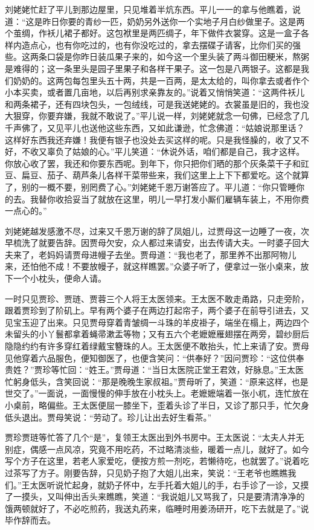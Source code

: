 刘姥姥忙赶了平儿到那边屋里，只见堆着半炕东西。平儿一一的拿与他瞧着，说道：``这是昨日你要的青纱一匹，奶奶另外送你一个实地子月白纱做里子。这是两个茧绸，作袄儿裙子都好。这包袱里是两匹绸子，年下做件衣裳穿。这是一盒子各样内造点心，也有你吃过的，也有你没吃过的，拿去摆碟子请客，比你们买的强些。这两条口袋是你昨日装瓜果子来的，如今这一个里头装了两斗御田粳米，熬粥是难得的；这一条里头是园子里果子和各样干果子。这一包是八两银子。这都是我们奶奶的。这两包每包里头五十两，共是一百两，是太太给的，叫你拿去或者作个小本买卖，或者置几亩地，以后再别求亲靠友的。''说着又悄悄笑道：``这两件袄儿和两条裙子，还有四块包头，一包绒线，可是我送姥姥的。衣裳虽是旧的，我也没大狠穿，你要弃嫌，我就不敢说了。''平儿说一样，刘姥姥就念一句佛，已经念了几千声佛了，又见平儿也送他这些东西，又如此谦逊，忙念佛道：``姑娘说那里话？这样好东西我还弃嫌！我便有银子也没处去买这样的呢。只是我怪臊的，收了又不好，不收又辜负了姑娘的心。''平儿笑道：``休说外话，咱们都是自己，我才这样。你放心收了罢，我还和你要东西呢。到年下，你只把你们晒的那个灰条菜干子和豇豆、扁豆、茄子、葫芦条儿各样干菜带些来，我们这里上上下下都爱吃。这个就算了，别的一概不要，别罔费了心。''刘姥姥千恩万谢答应了。平儿道：``你只管睡你的去。我替你收拾妥当了就放在这里，明儿一早打发小厮们雇辆车装上，不用你费一点心的。''

刘姥姥越发感激不尽，过来又千恩万谢的辞了凤姐儿，过贾母这一边睡了一夜，次早梳洗了就要告辞。因贾母欠安，众人都过来请安，出去传请大夫。一时婆子回大夫来了，老妈妈请贾母进幔子去坐。贾母道：``我也老了，那里养不出那阿物儿来，还怕他不成！不要放幔子，就这样瞧罢。''众婆子听了，便拿过一张小桌来，放下一个小枕头，便命人请。

一时只见贾珍、贾琏、贾蓉三个人将王太医领来。王太医不敢走甬路，只走旁阶，跟着贾珍到了阶矶上。早有两个婆子在两边打起帘子，两个婆子在前导引进去，又见宝玉迎了出来。只见贾母穿着青皱绸一斗珠的羊皮褂子，端坐在榻上，两边四个未留头的小丫鬟都拿着蝇帚漱盂等物；又有五六个老嬷嬷雁翅摆在两旁，碧纱厨后隐隐约约有许多穿红着绿戴宝簪珠的人。王太医便不敢抬头，忙上来请了安。贾母见他穿着六品服色，便知御医了，也便含笑问：``供奉好？''因问贾珍：``这位供奉贵姓？''贾珍等忙回：``姓王。''贾母道：``当日太医院正堂王君效，好脉息。''王太医忙躬身低头，含笑回说：``那是晚晚生家叔祖。''贾母听了，笑道：``原来这样，也是世交了。''一面说，一面慢慢的伸手放在小枕头上。老嬷嬷端着一张小杌，连忙放在小桌前，略偏些。王太医便屈一膝坐下，歪着头诊了半日，又诊了那只手，忙欠身低头退出。贾母笑说：``劳动了。珍儿让出去好生看茶。''

贾珍贾琏等忙答了几个``是''，复领王太医出到外书房中。王太医说：``太夫人并无别症，偶感一点风凉，究竟不用吃药，不过略清淡些，暖着一点儿，就好了。如今写个方子在这里，若老人家爱吃，便按方煎一剂吃，若懒待吃，也就罢了。''说着吃过茶写了方子。刚要告辞，只见奶子抱了大姐儿出来，笑说：``王老爷也瞧瞧我们。''王太医听说忙起身，就奶子怀中，左手托着大姐儿的手，右手诊了一诊，又摸了一摸头，又叫伸出舌头来瞧瞧，笑道：``我说姐儿又骂我了，只是要清清净净的饿两顿就好了，不必吃煎药，我送丸药来，临睡时用姜汤研开，吃下去就是了。''说毕作辞而去。

